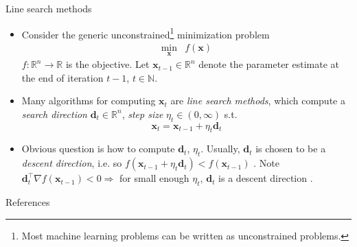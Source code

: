 \documentclass{beamer}
\numberwithin{equation}{section}
\begin{document}
\begin{frame}{Line search methods}
    \begin{itemize}
        \item
        Consider the generic unconstrained\footnote{
            Most machine learning problems can be written as unconstrained
            problems.
        } minimization problem
        \begin{equation} \label{eq:unconstrained_min}
            \begin{array}{ll}
                \displaystyle\min_\mathbf{x} & f(\mathbf{x})
            \end{array}
        \end{equation}
        $ f : \mathbb{R}^n \rightarrow \mathbb{R} $ is the objective. Let
        $ \mathbf{x}_{t - 1} \in \mathbb{R}^n $ denote the parameter
        estimate at the end of iteration $ t - 1 $, $ t \in \mathbb{N} $.

        \item
        Many algorithms for computing $ \mathbf{x}_t $ are
        \textit{line search methods}, which compute a \textit{search direction}
        $ \mathbf{d}_t \in \mathbb{R}^n $, \textit{step size}
        $ \eta_t \in (0, \infty) $ s.t. \cite{nocedal_opt}
        \begin{equation} \label{eq:line_search_eq}
            \mathbf{x}_t = \mathbf{x}_{t - 1} + \eta_t\mathbf{d}_t
        \end{equation}

        \item
        Obvious question is how to compute $ \mathbf{d}_t $, $ \eta_t $.
        Usually, $ \mathbf{d}_t $ is chosen to be a \textit{descent direction},
        i.e. so $ f(\mathbf{x}_{t - 1} + \eta_t\mathbf{d}_t) <
        f(\mathbf{x}_{t - 1}) $ \cite{nocedal_opt}. Note 
        $ \mathbf{d}_t^\top\nabla f(\mathbf{x}_{t - 1}) < 0 \Rightarrow $
        for small enough $ \eta_t $, $ \mathbf{d}_t $ is a descent direction
        \cite{nocedal_opt}.
    \end{itemize}

    \medskip
\end{frame}


\begin{frame}{References}
    
    
\end{frame}
\end{document}
